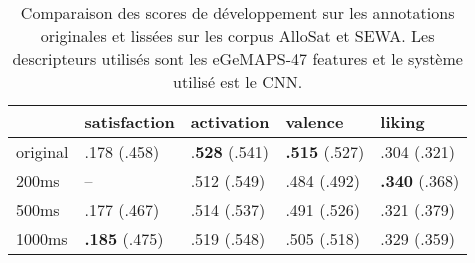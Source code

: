 \begin{table}[htp!]
    \centering
    \begin{tabular}{| l| l || l | l | l |}
        \hline
                    &satisfaction     &activation    &valence   &liking  \\
        \hline
        original    &.178 (.458)     &.\textbf{528} (.541) &\textbf{.515} (.527) &.304 (.321)  \\
        200ms       &--              &.512 (.549) &.484 (.492) &\textbf{.340} (.368)  \\
        500ms       &.177 (.467)     &.514 (.537) &.491 (.526) &.321 (.379)  \\
        1000ms      &\textbf{.185} (.475)    &.519 (.548) &.505 (.518) &.329 (.359) \\
        \hline
    \end{tabular}
    \caption{Comparaison des scores de développement sur les annotations originales et lissées sur les corpus AlloSat et SEWA. Les descripteurs utilisés sont les eGeMAPS-47 features et le système utilisé est le CNN.}
    \label{tab:allosatLisse}
\end{table}
